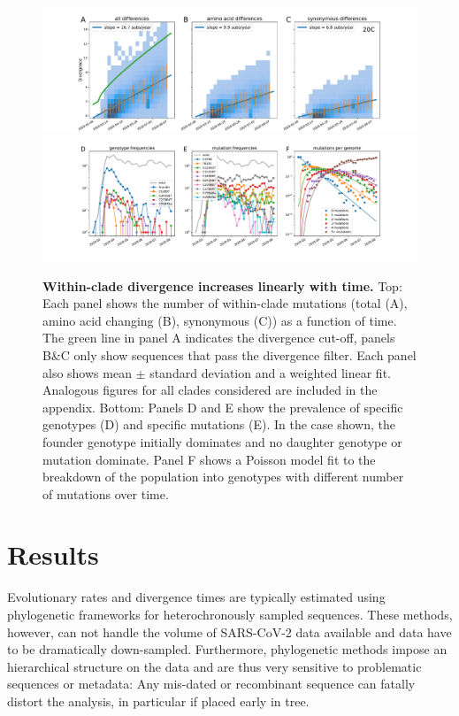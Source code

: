 \documentclass[aps,rmp, twocolumn]{revtex4}
\begin{document}
\begin{figure}[tb]
    \includegraphics[width=\textwidth]{figures/rtt/20C_rtt.pdf}
    \includegraphics[width=\textwidth]{figures/counts/20C_counts.pdf}
    \caption{{\bf Within-clade divergence increases linearly with time.} Top: Each panel shows the number of within-clade mutations (total (A), amino acid changing (B), synonymous (C)) as a function of time.
    The green line in panel A indicates the divergence cut-off, panels B\&C only show sequences that pass the divergence filter. Each panel also shows mean $\pm$ standard deviation and a weighted linear fit. Analogous figures for all clades considered are included in the appendix.
    Bottom: Panels D and E show the prevalence of specific genotypes (D) and specific mutations (E). In the case shown, the founder genotype initially dominates and no daughter genotype or mutation dominate. Panel F shows a Poisson model fit to the breakdown of the population into genotypes with different number of mutations over time.
    \label{fig:within_clade}}
\end{figure}

\section*{Results}

Evolutionary rates and divergence times are typically estimated using phylogenetic frameworks for heterochronously sampled sequences.
These methods, however, can not handle the volume of SARS-CoV-2 data available and data have to be dramatically down-sampled.
Furthermore, phylogenetic methods impose an hierarchical structure on the data and are thus very sensitive to problematic sequences or metadata: Any mis-dated or recombinant sequence can fatally distort the analysis, in particular if placed early in tree.
\end{document}
